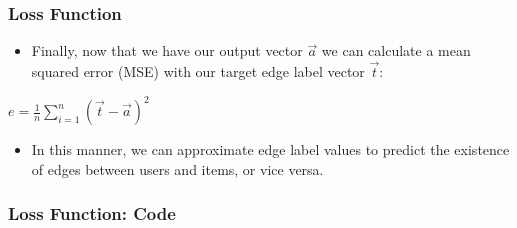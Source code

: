 \documentclass{beamer}
\begin{document}
\begin{frame}[fragile]
\frametitle{Loss Function}
\begin{itemize}

\item Finally, now that we have our output vector $\overrightarrow{a}$ we can calculate a mean squared error (MSE) with our target edge label vector $\overrightarrow{t}$:

\end{itemize}

\vspace{0.5cm}

\begin{center}
    $e = \frac{1}{n} \sum_{i=1}^{n} (\overrightarrow{t} - \overrightarrow{a})^2$
\end{center}

\vspace{0.5cm}

\begin{itemize}

\item In this manner, we can approximate edge label values to predict the existence of edges between users and items, or vice versa.

\end{itemize}
\end{frame}


\begin{frame}[fragile]
\frametitle{Loss Function: Code}



\end{frame}

\end{document}
